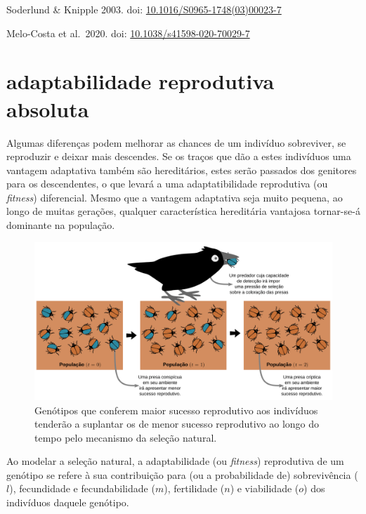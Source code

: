 \documentclass[
]{book}
\begin{document}
Soderlund \& Knipple 2003. doi: \href{https://doi.org/10.1016/S0965-1748(03)00023-7}{10.1016/S0965-1748(03)00023-7}

Melo-Costa et al.~2020. doi: \href{https://doi.org/10.1038/s41598-020-70029-7}{10.1038/s41598-020-70029-7}

\hypertarget{adaptabilidade-reprodutiva-absoluta}{%
\section{adaptabilidade reprodutiva absoluta}\label{adaptabilidade-reprodutiva-absoluta}}

Algumas diferenças podem melhorar as chances de um indivíduo sobreviver, se reproduzir e deixar mais descendes. Se os traços que dão a estes indivíduos uma vantagem adaptativa também são hereditários, estes serão passados dos genitores para os descendentes, o que levará a uma adaptatibilidade reprodutiva (ou \emph{fitness}) diferencial. Mesmo que a vantagem adaptativa seja muito pequena, ao longo de muitas gerações, qualquer característica hereditária vantajosa tornar-se-á dominante na população.

\begin{figure}

{\centering \includegraphics[width=800px]{figs/bettles_prey_selection} 

}

\caption{Genótipos que conferem maior sucesso reprodutivo aos indivíduos tenderão a suplantar os de menor sucesso reprodutivo ao longo do tempo pelo mecanismo da seleção natural.}\label{fig:bettlesprey}
\end{figure}

Ao modelar a seleção natural, a adaptabilidade (ou \emph{fitness}) reprodutiva de um genótipo se refere à sua contribuição para (ou a probabilidade de) sobrevivência (\(l\)), fecundidade e fecundabilidade (\(m\)), fertilidade (\(n\)) e viabilidade (\(o\)) dos indivíduos daquele genótipo.
\end{document}
